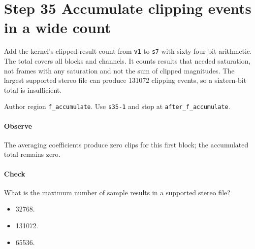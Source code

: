 \section{Step 35 Accumulate clipping events in a wide count}\label{pcm-wav-s35}
Add the kernel's clipped-result count from \texttt{v1} to \texttt{s7} with sixty-four-bit arithmetic. The total covers all blocks and channels. It counts results that needed saturation, not frames with any saturation and not the sum of clipped magnitudes. The largest supported stereo file can produce 131072 clipping events, so a sixteen-bit total is insufficient.

Author region \texttt{f\_accumulate}. Use \texttt{s35-1} and stop at \texttt{after\_f\_accumulate}.

\paragraph{Observe} The averaging coefficients produce zero clips for this first block; the accumulated total remains zero.

\paragraph{Check} What is the maximum number of sample results in a supported stereo file?
\begin{itemize}
  \item[A.] 32768.
  \item[B.] 131072.
  \item[C.] 65536.
\end{itemize}
